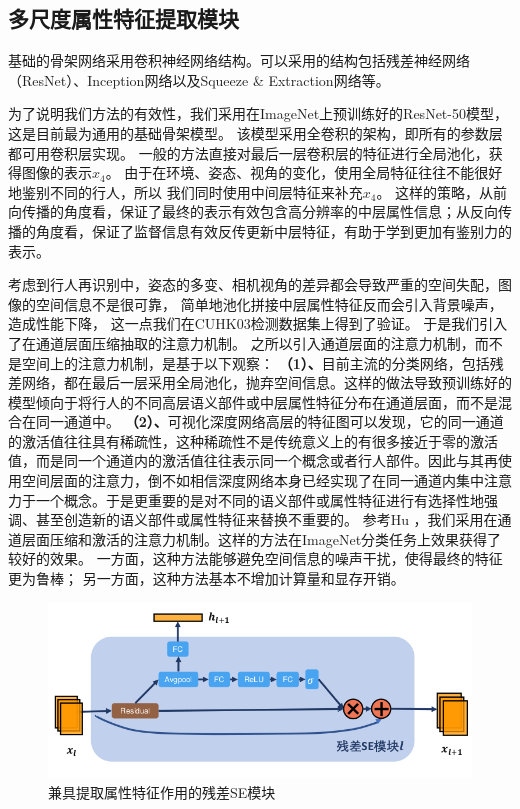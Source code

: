 \subsection{多尺度属性特征提取模块}

基础的骨架网络采用卷积神经网络结构。可以采用的结构包括残差神经网络（ResNet）\cite{he2016identity}、Inception网络\cite{szegedy2015going}以及Squeeze \& Extraction网络\cite{hu2017senet}等。

为了说明我们方法的有效性，我们采用在ImageNet上预训练好的ResNet-50模型，这是目前最为通用的基础骨架模型。
该模型采用全卷积的架构，即所有的参数层都可用卷积层实现。
一般的方法直接对最后一层卷积层的特征进行全局池化，获得图像的表示$x_4$。
由于在环境、姿态、视角的变化，使用全局特征往往不能很好地鉴别不同的行人，所以
我们同时使用中间层特征来补充$x_4$。
这样的策略，从前向传播的角度看，保证了最终的表示有效包含高分辨率的中层属性信息；从反向传播的角度看，保证了监督信息有效反传更新中层特征，有助于学到更加有鉴别力的表示。

考虑到行人再识别中，姿态的多变、相机视角的差异都会导致严重的空间失配，图像的空间信息不是很可靠，
简单地池化拼接中层属性特征反而会引入背景噪声，造成性能下降，
这一点我们在CUHK03检测数据集上得到了验证。
于是我们引入了在通道层面压缩抽取的注意力机制。
之所以引入通道层面的注意力机制，而不是空间上的注意力机制，是基于以下观察：
\textbf{（1）、}目前主流的分类网络，包括残差网络，都在最后一层采用全局池化，抛弃空间信息。这样的做法导致预训练好的模型倾向于将行人的不同高层语义部件或中层属性特征分布在通道层面，而不是混合在同一通道中。
\textbf{（2）、}可视化深度网络高层的特征图可以发现，它的同一通道的激活值往往具有稀疏性，这种稀疏性不是传统意义上的有很多接近于零的激活值，而是同一个通道内的激活值往往表示同一个概念或者行人部件。因此与其再使用空间层面的注意力，倒不如相信深度网络本身已经实现了在同一通道内集中注意力于一个概念。于是更重要的是对不同的语义部件或属性特征进行有选择性地强调、甚至创造新的语义部件或属性特征来替换不重要的。
参考Hu \etal \cite{hu2017senet}，我们采用在通道层面压缩和激活的注意力机制。这样的方法在ImageNet分类任务上效果获得了较好的效果。
一方面，这种方法能够避免空间信息的噪声干扰，使得最终的特征更为鲁棒；
另一方面，这种方法基本不增加计算量和显存开销。

\begin{figure}
	\centering
	\includegraphics[width=.9\textwidth]{fig/2018-05-11-16-53-10.png}
	\caption{兼具提取属性特征作用的残差SE模块}
	\label{fig:resse}
\end{figure}

